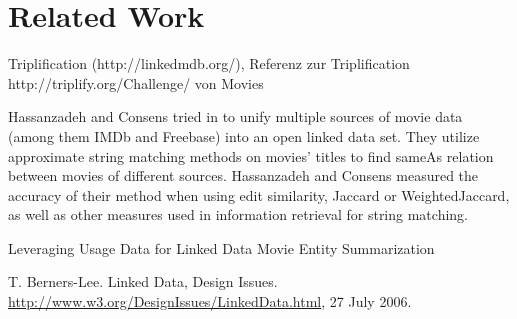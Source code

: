 \section{Related Work}
\label{sec_related_work}


Triplification (http://linkedmdb.org/), Referenz zur Triplification http://triplify.org/Challenge/ von Movies

Hassanzadeh and Consens tried in \cite{LMDB} to unify multiple sources of movie data (among them IMDb and Freebase) into an open linked data set.
They utilize approximate string matching methods on movies' titles to find sameAs relation between movies of different sources.
Hassanzadeh and Consens measured the accuracy of their method when using edit similarity, Jaccard or WeightedJaccard, as well as other measures used in information retrieval for string matching.

Leveraging Usage Data for Linked Data Movie Entity Summarization 
\cite{MovieSummarization}

T. Berners-Lee. Linked Data, Design Issues.
\url{http://www.w3.org/DesignIssues/LinkedData.html}, 27 July 2006.